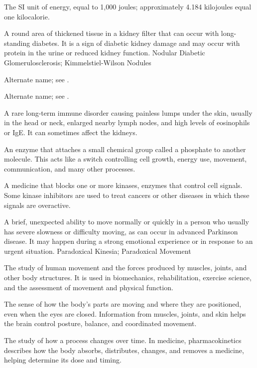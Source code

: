  The SI unit of energy, equal to 1,000 joules; approximately 4.184 kilojoules equal one kilocalorie.

 A round area of thickened tissue in a kidney filter that can occur with long-standing diabetes. It is a sign of diabetic kidney damage and may occur with protein in the urine or reduced kidney function.
\synonyms
Nodular Diabetic Glomerulosclerosis; Kimmelstiel-Wilson Nodules

 Alternate name; see .

 Alternate name; see .

 A rare long-term immune disorder causing painless lumps under the skin, usually in the head or neck, enlarged nearby lymph nodes, and high levels of eosinophils or IgE. It can sometimes affect the kidneys.

 An enzyme that attaches a small chemical group called a phosphate to another molecule. This acts like a switch controlling cell growth, energy use, movement, communication, and many other processes.

 A medicine that blocks one or more kinases, enzymes that control cell signals. Some kinase inhibitors are used to treat cancers or other diseases in which these signals are overactive.

 A brief, unexpected ability to move normally or quickly in a person who usually has severe slowness or difficulty moving, as can occur in advanced Parkinson disease. It may happen during a strong emotional experience or in response to an urgent situation.
\synonyms
Paradoxical Kinesia; Paradoxical Movement

 The study of human movement and the forces produced by muscles, joints, and other body structures. It is used in biomechanics, rehabilitation, exercise science, and the assessment of movement and physical function.

 The sense of how the body's parts are moving and where they are positioned, even when the eyes are closed. Information from muscles, joints, and skin helps the brain control posture, balance, and coordinated movement.

 The study of how a process changes over time. In medicine, pharmacokinetics describes how the body absorbs, distributes, changes, and removes a medicine, helping determine its dose and timing.

